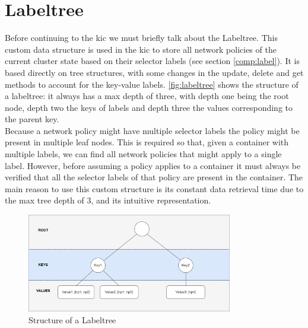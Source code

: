 

\section{Labeltree} \label{impl:labeltree}
Before continuing to the \acrlong{kic} we must briefly talk about the Labeltree. This custom data structure is used in the \acrshort{kic} to store all network policies of the current cluster state based on their selector labels (see section \ref{comp:label}). It is based directly on tree structures, with some changes in the update, delete and get methods to account for the key-value labels. \autoref{fig:labeltree} shows the structure of a labeltree: it always has a max depth of three, with depth one being the root node, depth two the keys of labels and depth three the values corresponding to the parent key. 
\\[10pt]

Because a network policy might have multiple selector labels the policy might be present in multiple leaf nodes. This is required so that, given a container with multiple labels, we can find all network policies that might apply to a single label. However, before assuming a policy applies to a container it must always be verified that all the selector labels of that policy are present in the container. The main reason to use this custom structure is its constant data retrieval time due to the max tree depth of 3, and its intuitive representation. 
\begin{figure}[htbp]
  \centering
  \includegraphics[width=0.8\textwidth]{images/labeltree.png}
  \caption{Structure of a Labeltree}
  \label{fig:labeltree}
\end{figure}

\newpage
